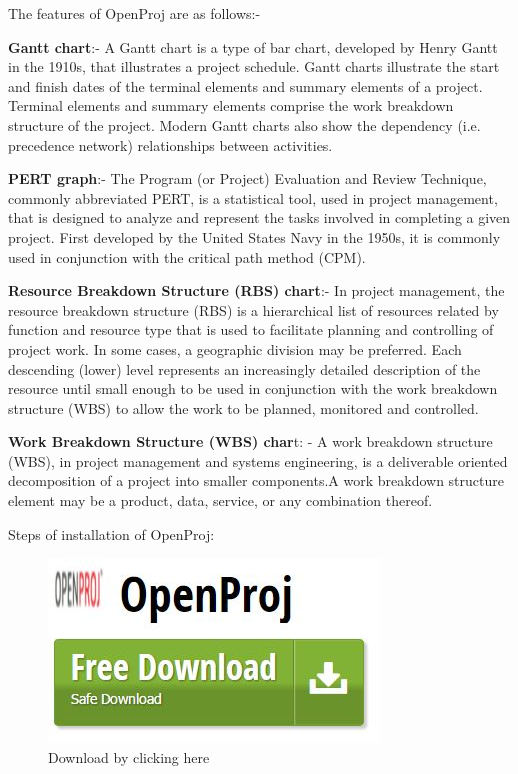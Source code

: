 The features of OpenProj are as follows:-
\begin{description}
\item{\textbf{Gantt chart}}:- A Gantt chart is a type of bar chart, developed by Henry Gantt in the 1910s, that illustrates a project schedule. Gantt charts illustrate the start and finish dates of the terminal elements and summary elements of a project. Terminal elements and summary elements comprise the work breakdown structure of the project. Modern Gantt charts also show the dependency (i.e. precedence network) relationships between activities.

\item{\textbf{PERT graph}}:- The Program (or Project) Evaluation and Review Technique, commonly abbreviated PERT, is a statistical tool, used in project management, that is designed to analyze and represent the tasks involved in completing a given project. First developed by the United States Navy in the 1950s, it is commonly used in conjunction with the critical path method (CPM).

\item {\textbf{Resource Breakdown Structure (RBS) chart}}:- In project management, the resource breakdown structure (RBS) is a hierarchical list of resources related by function and resource type that is used to facilitate planning and controlling of project work. In some cases, a geographic division may be preferred. Each descending (lower) level represents an increasingly detailed description of the resource until small enough to be used in conjunction with the work breakdown structure (WBS) to allow the work to be planned, monitored and controlled.

\item{\textbf{Work Breakdown Structure (WBS) char}t}: - A work breakdown structure (WBS), in project management and systems engineering, is a deliverable oriented decomposition of a project into smaller components.A work breakdown structure element may be a product, data, service, or any combination thereof.

\end{description}


Steps of installation of OpenProj:
\begin{figure}[!th]
\centering
\includegraphics[width=0.7\linewidth]{input/images/image30.jpeg}
\caption{Download by clicking here}
\label{fig:image1}
\end{figure}

